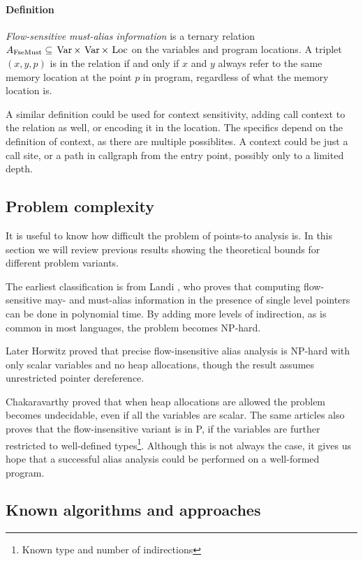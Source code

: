 \paragraph{Definition} {\it Flow-sensitive must-alias information} is a ternary
relation $A_{\mathrm{FseMust}} \subseteq \operatorname*{\,Var} \times \operatorname*{\,Var} \times \operatorname*{\,Loc}$ on the variables
and program locations. A triplet $(x,y,p)$ is in the relation if and only if $x$
and $y$ always refer to the same memory location at the point $p$ in program,
regardless of what the memory location is.

A similar definition could be used for context sensitivity, adding call context
to the relation as well, or encoding it in the location. The specifics depend on
the definition of context, as there are multiple possiblites. A context could be
just a call site, or a path in callgraph from the entry point, possibly only to
a limited depth.

\subsection{Problem complexity}

It is useful to know how difficult the problem of points-to analysis is. In this
section we will review previous results showing the theoretical bounds for
different problem variants.

The earliest classification is from Landi \cite{Landi1991}, who proves that
computing flow-sensitive may- and must-alias information in the presence of
single level pointers can be done in polynomial time. By adding more levels of
indirection, as is common in most languages, the problem becomes NP-hard.

Later Horwitz \cite{Horwitz1997}  proved that precise flow-insensitive alias
analysis is NP-hard with only scalar variables and no heap allocations, though
the result assumes unrestricted pointer dereference.

Chakaravarthy \cite{ptcomp} proved that when heap allocations are allowed the
problem becomes undecidable, even if all the variables are scalar. The same
articles also proves that the flow-insensitive variant is in P, if the
variables are further restricted to well-defined types\footnote{Known type and
number of indirections}. Although this is not always the case, it gives us hope
that a successful alias analysis could be performed on a well-formed program.



\subsection{Known algorithms and approaches}

